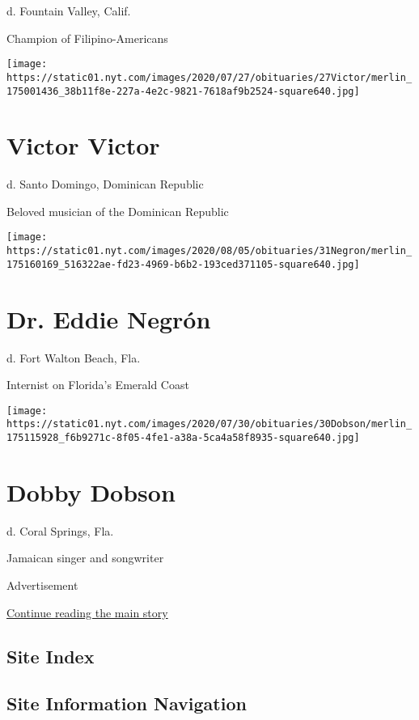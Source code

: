 d. Fountain Valley, Calif.

Champion of Filipino-Americans

\texttt{[image: https://static01.nyt.com/images/2020/07/27/obituaries/27Victor/merlin\_175001436\_38b11f8e-227a-4e2c-9821-7618af9b2524-square640.jpg]}

\hypertarget{victor-victor}{%
\section{Victor Victor}\label{victor-victor}}

d. Santo Domingo, Dominican Republic

Beloved musician of the Dominican Republic

\texttt{[image: https://static01.nyt.com/images/2020/08/05/obituaries/31Negron/merlin\_175160169\_516322ae-fd23-4969-b6b2-193ced371105-square640.jpg]}

\hypertarget{dr-eddie-negruxf3n}{%
\section{Dr. Eddie Negrón}\label{dr-eddie-negruxf3n}}

d. Fort Walton Beach, Fla.

Internist on Florida's Emerald Coast

\texttt{[image: https://static01.nyt.com/images/2020/07/30/obituaries/30Dobson/merlin\_175115928\_f6b9271c-8f05-4fe1-a38a-5ca4a58f8935-square640.jpg]}

\hypertarget{dobby-dobson}{%
\section{Dobby Dobson}\label{dobby-dobson}}

d. Coral Springs, Fla.

Jamaican singer and songwriter

Advertisement

\protect\hyperlink{after-bottom}{Continue reading the main story}

\hypertarget{site-index}{%
\subsection{Site Index}\label{site-index}}

\hypertarget{site-information-navigation}{%
\subsection{Site Information
Navigation}\label{site-information-navigation}}

